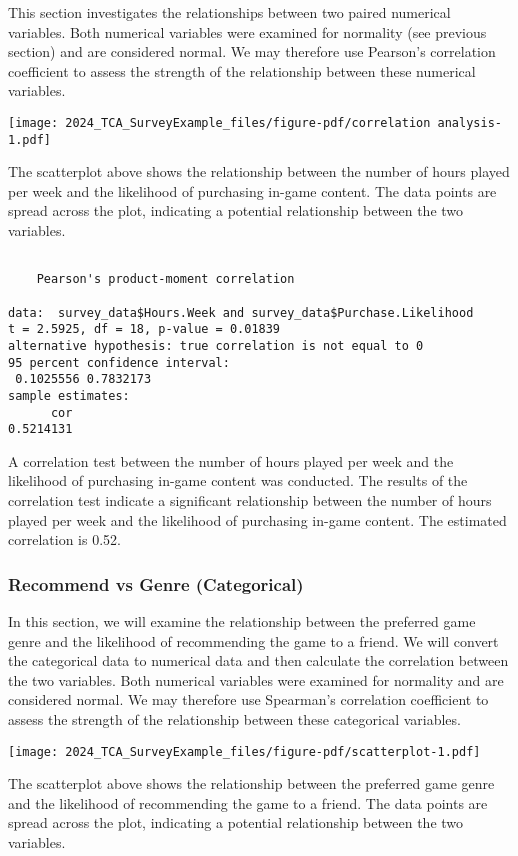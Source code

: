 \documentclass[
  letterpaper,
  DIV=11,
  numbers=noendperiod]{scrartcl}
\begin{document}
This section investigates the relationships between two paired numerical
variables. Both numerical variables were examined for normality (see
previous section) and are considered normal. We may therefore use
Pearson's correlation coefficient to assess the strength of the
relationship between these numerical variables.

\texttt{[image: 2024\_TCA\_SurveyExample\_files/figure-pdf/correlation analysis-1.pdf]}

The scatterplot above shows the relationship between the number of hours
played per week and the likelihood of purchasing in-game content. The
data points are spread across the plot, indicating a potential
relationship between the two variables.

\begin{verbatim}

    Pearson's product-moment correlation

data:  survey_data$Hours.Week and survey_data$Purchase.Likelihood
t = 2.5925, df = 18, p-value = 0.01839
alternative hypothesis: true correlation is not equal to 0
95 percent confidence interval:
 0.1025556 0.7832173
sample estimates:
      cor 
0.5214131 
\end{verbatim}

A correlation test between the number of hours played per week and the
likelihood of purchasing in-game content was conducted. The results of
the correlation test indicate a significant relationship between the
number of hours played per week and the likelihood of purchasing in-game
content. The estimated correlation is 0.52.

\subsubsection{Recommend vs Genre
(Categorical)}\label{recommend-vs-genre-categorical}

In this section, we will examine the relationship between the preferred
game genre and the likelihood of recommending the game to a friend. We
will convert the categorical data to numerical data and then calculate
the correlation between the two variables. Both numerical variables were
examined for normality and are considered normal. We may therefore use
Spearman's correlation coefficient to assess the strength of the
relationship between these categorical variables.

\texttt{[image: 2024\_TCA\_SurveyExample\_files/figure-pdf/scatterplot-1.pdf]}

The scatterplot above shows the relationship between the preferred game
genre and the likelihood of recommending the game to a friend. The data
points are spread across the plot, indicating a potential relationship
between the two variables.
\end{document}

